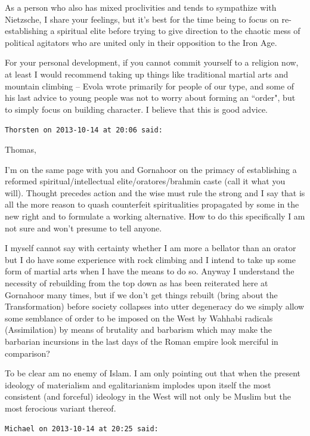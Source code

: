 \begin{footnotesize}
\begin{sffamily}
As a person who also has mixed proclivities and tends to sympathize with Nietzsche, I share your feelings, but it's best for the time being to focus on re-establishing a spiritual elite before trying to give direction to the chaotic mess of political agitators who are united only in their opposition to the Iron Age.

For your personal development, if you cannot commit yourself to a religion now, at least I would recommend taking up things like traditional martial arts and mountain climbing – Evola wrote primarily for people of our type, and some of his last advice to young people was not to worry about forming an ``order", but to simply focus on building character. I believe that this is good advice.


\hfill

\texttt{Thorsten on 2013-10-14 at 20:06 said: }

Thomas,

I'm on the same page with you and Gornahoor on the primacy of establishing a reformed spiritual/intellectual elite/oratores/brahmin caste (call it what you will). Thought precedes action and the wise must rule the strong and I say that is all the more reason to quash counterfeit spiritualities propagated by some in the new right and to formulate a working alternative. How to do this specifically I am not sure and won't presume to tell anyone.

I myself cannot say with certainty whether I am more a bellator than an orator but I do have some experience with rock climbing and I intend to take up some form of martial arts when I have the means to do so. Anyway I understand the necessity of rebuilding from the top down as has been reiterated here at Gornahoor many times, but if we don't get things rebuilt (bring about the Transformation) before society collapses into utter degeneracy do we simply allow some semblance of order to be imposed on the West by Wahhabi radicals (Assimilation) by means of brutality and barbarism which may make the barbarian incursions in the last days of the Roman empire look merciful in comparison?

To be clear am no enemy of Islam. I am only pointing out that when the present ideology of materialism and egalitarianism implodes upon itself the most consistent (and forceful) ideology in the West will not only be Muslim but the most ferocious variant thereof.


\hfill

\texttt{Michael on 2013-10-14 at 20:25 said: }


\end{sffamily}
\end{footnotesize}
